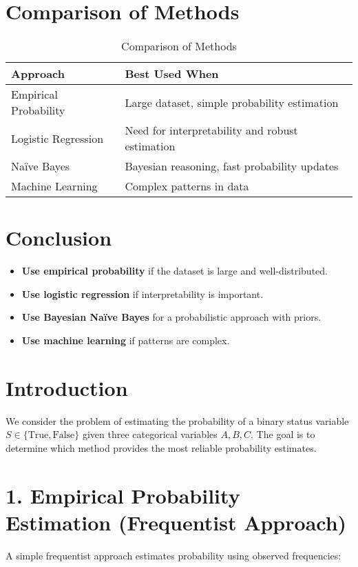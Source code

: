 \documentclass{article}
\begin{document}
\section{Comparison of Methods}
\begin{table}[h]
    \centering
    \begin{tabular}{l|l}
        \toprule
        Approach & Best Used When \\
        \midrule
        Empirical Probability & Large dataset, simple probability estimation \\
        Logistic Regression & Need for interpretability and robust estimation \\
        Naïve Bayes & Bayesian reasoning, fast probability updates \\
        Machine Learning & Complex patterns in data \\
        \bottomrule
    \end{tabular}
    \caption{Comparison of Methods}
\end{table}

\section{Conclusion}
\begin{itemize}
    \item \textbf{Use empirical probability} if the dataset is large and well-distributed.
    \item \textbf{Use logistic regression} if interpretability is important.
    \item \textbf{Use Bayesian Naïve Bayes} for a probabilistic approach with priors.
    \item \textbf{Use machine learning} if patterns are complex.
\end{itemize}






\section{Introduction}
We consider the problem of estimating the probability of a binary status variable \( S \in \{\text{True}, \text{False}\} \) given three categorical variables \( A, B, C \). The goal is to determine which method provides the most reliable probability estimates.

\section{1. Empirical Probability Estimation (Frequentist Approach)}
A simple frequentist approach estimates probability using observed frequencies:
\end{document}
